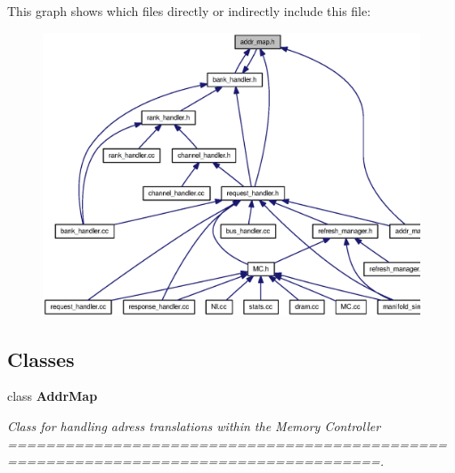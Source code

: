 This graph shows which files directly or indirectly include this file:\nopagebreak
\begin{figure}[H]
\begin{center}
\leavevmode
\includegraphics[width=318pt]{addr__map_8h__dep__incl}
\end{center}
\end{figure}
\subsection*{Classes}
\begin{CompactItemize}
\item 
class {\bf AddrMap}
\begin{CompactList}\small\item\em Class for handling adress translations within the Memory Controller =====================================================================================. \item\end{CompactList}\end{CompactItemize}
